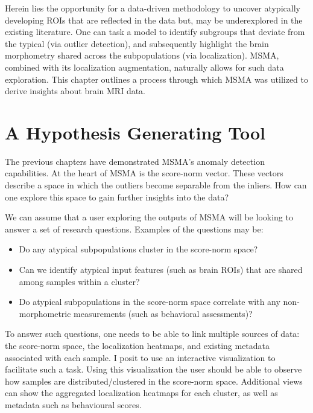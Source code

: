 Herein lies the opportunity for a data-driven methodology to uncover atypically developing ROIs that are reflected in the data but, may be underexplored in the existing  literature. One can task a model to identify subgroups that deviate from the typical (via outlier detection), and subsequently highlight the brain morphometry shared across the subpopulations (via localization).  MSMA, combined with its localization augmentation, naturally allows for such data exploration. This chapter outlines a process through which MSMA was utilized to derive insights about brain MRI data.

\section{A Hypothesis Generating Tool}

The previous chapters have demonstrated MSMA's anomaly detection capabilities. At the heart of MSMA is the score-norm vector. These vectors describe a space in which the outliers become separable from the inliers. How can one explore this space to gain further insights into the data?

We can assume that a user exploring the outputs of MSMA will be looking to answer a set of research questions. Examples of the questions may be:
\begin{itemize}
    \item Do any atypical subpopulations cluster in the score-norm space?
    \item Can we identify atypical input features (such as brain ROIs)  that are shared among samples within a cluster?
    \item Do atypical subpopulations in the score-norm space correlate with any non-morphometric measurements (such as behavioral assessments)?
\end{itemize}

To answer such questions, one needs to be able to link multiple sources of data: the score-norm space, the localization heatmaps, and existing metadata associated with each sample. I posit to use an interactive visualization to facilitate such a task.
Using this visualization the user should be able to observe how samples are distributed/clustered in the score-norm space. Additional views can show the aggregated localization heatmaps for each cluster, as well as metadata such as behavioural scores.


